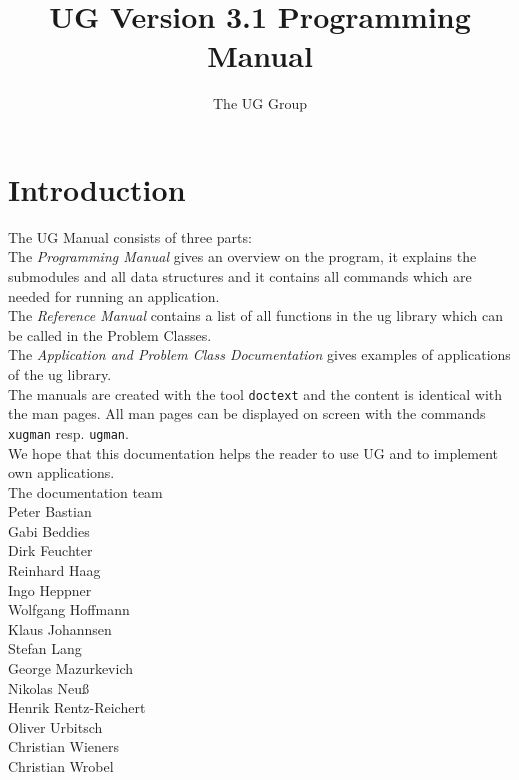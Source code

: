 


\pagestyle{myheadings}
\sloppy
\makeindex


\newcommand{\sectitle}{\mbox{}}
\setcounter{page}{0}

\title{UG Version 3.1 Programming Manual}
\author{The UG Group}

\maketitle


\section*{Introduction}

The UG Manual consists of three parts:
\\[5mm]  
The {\em Programming Manual} gives an overview on the program, it
explains the submodules and all data structures and it contains
all commands which are needed for running an application.
\\[5mm]  
The {\em Reference Manual} contains a list of all 
functions in the ug library which can be called in the Problem Classes.
\\[5mm]
The {\em Application and Problem Class Documentation} gives examples
of applications of the ug library.
\\[5mm]
The manuals are created with the tool {\tt doctext} and the content is 
identical with the man pages. All man pages can be displayed on screen 
with the commands {\tt xugman} resp. {\tt ugman}.
\\[5mm]
We hope that this documentation helps the reader to use UG 
and to implement own applications.
\\[1cm]
The documentation team
\\[1cm]
Peter Bastian\\
Gabi Beddies\\
Dirk Feuchter\\
Reinhard Haag\\
Ingo Heppner\\
Wolfgang Hoffmann\\
Klaus Johannsen\\
Stefan Lang\\
George Mazurkevich\\
Nikolas Neu\ss\\
Henrik Rentz-Reichert\\
Oliver Urbitsch\\
Christian Wieners\\
Christian Wrobel

